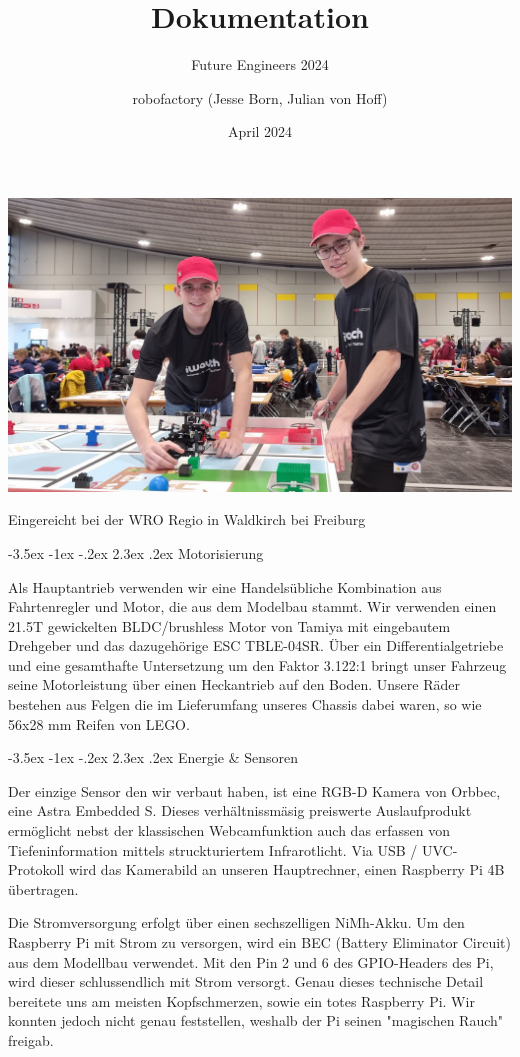 \documentclass[a4paper]{scrarticle}
\makeatletter
\renewcommand\section{\@startsection {section}{1}{\z@}%
                                   {-3.5ex \@plus -1ex \@minus -.2ex}%
                                   {2.3ex \@plus.2ex}%
                                   {\Huge\AKAfont}}
\renewcommand{\maketitle}{%
																		 \begin{titlepage}
																			 \null\vfill %
																			 \begin{center}
																				{\huge\@title\par}%
																				\vspace{0.5cm} %
																				{\large\@subtitle\par} %
																				\vspace{1.5cm} %
																				{\Large\@author\par}
																				\vspace{2.5cm} %
																				\begin{center}
																					\includegraphics[width=15cm]{team}
																				\end{center}
																				\vfill
																				\vspace{0.5cm} %
																				{\large\@date\par} %
																				Eingereicht bei der WRO Regio in Waldkirch bei Freiburg
																			 \end{center}
																			 \@thanks %
																		 \end{titlepage}%
																	 }
\makeatother
\begin{document}
\title{\AKAfont\Huge\textcolor{AKSAcolor}{Dokumentation}}
\subtitle{Future Engineers 2024}
\author{robofactory (Jesse Born, Julian von Hoff)}
\date{April 2024}


\maketitle
\clearpage
\newpage



\section{Motorisierung}

Als Hauptantrieb verwenden wir eine Handelsübliche Kombination aus Fahrtenregler und Motor, die aus dem Modelbau stammt.
Wir verwenden einen 21.5T gewickelten BLDC/brushless Motor von Tamiya mit eingebautem Drehgeber und das dazugehörige ESC TBLE-04SR. 
Über ein Differentialgetriebe und eine gesamthafte Untersetzung um den Faktor 3.122:1 bringt unser Fahrzeug seine Motorleistung über einen Heckantrieb auf den Boden.
Unsere Räder bestehen aus Felgen die im Lieferumfang unseres Chassis dabei waren, so wie 56x28 mm Reifen von LEGO.

\section{Energie \& Sensoren}

Der einzige Sensor den wir verbaut haben, ist eine RGB-D Kamera von Orbbec, eine Astra Embedded S.
Dieses verhältnissmäsig preiswerte Auslaufprodukt ermöglicht nebst der klassischen Webcamfunktion auch das erfassen von Tiefeninformation mittels struckturiertem Infrarotlicht.
Via USB / UVC-Protokoll wird das Kamerabild an unseren Hauptrechner, einen Raspberry Pi 4B übertragen.


Die Stromversorgung erfolgt über einen sechszelligen NiMh-Akku. Um den Raspberry Pi mit Strom zu versorgen, wird ein BEC (Battery Eliminator Circuit) aus dem Modellbau verwendet. 
Mit den Pin 2 und 6 des GPIO-Headers des Pi, wird dieser schlussendlich mit Strom versorgt.
Genau dieses technische Detail bereitete uns am meisten Kopfschmerzen, sowie ein totes Raspberry Pi. Wir konnten jedoch nicht genau feststellen, weshalb der Pi seinen "magischen Rauch" freigab.
\end{document}
